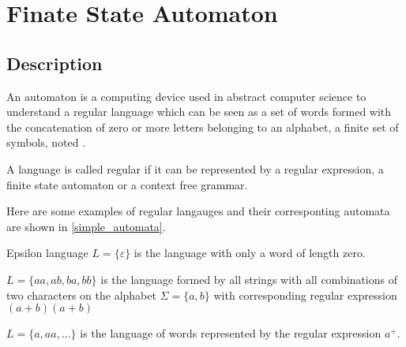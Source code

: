\section{Finate State Automaton}

\subsection{Description}
An automaton \automaton{} is a computing device used in abstract computer science to understand a regular language \lang{} which can be seen as a set of words formed with the concatenation of zero or more letters  belonging to an alphabet, a finite set of symbols, noted \alphabet{}.

\begin{theorem}
  A language is called regular if it can be represented by a regular expression, a finite state automaton or a context free grammar.
\end{theorem}

Here are some examples of regular langauges and their corresponting automata are shown in \cref{simple_automata}.
\begin{exmp}{Epsilon language}
  \label{exmp:lang_eps}
  $L = \{\varepsilon\}$ is the language with only a word of length zero.
\end{exmp}

\begin{exmp}
  \label{exmp:lang_ab_len2}
  $L = \{aa, ab, ba, bb\}$ is the language formed by all strings with all combinations of two characters on the alphabet $\Sigma = \{a, b\}$ with corresponding regular expression $(a+b)(a+b)$
\end{exmp}

\begin{exmp}
  \label{exmp:a_plus}
  $L = \{a, aa, ...\}$ is the language of words represented by the regular expression $a^+$.
\end{exmp}

